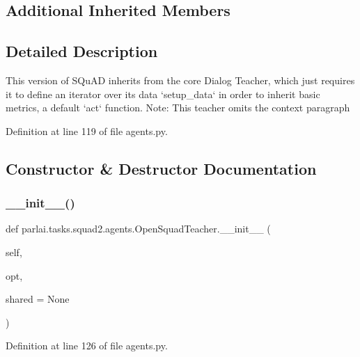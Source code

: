 \subsection*{Additional Inherited Members}


\subsection{Detailed Description}
\begin{DoxyVerb}This version of SQuAD inherits from the core Dialog Teacher, which just
requires it to define an iterator over its data `setup_data` in order to
inherit basic metrics, a default `act` function.
Note: This teacher omits the context paragraph
\end{DoxyVerb}
 

Definition at line 119 of file agents.\+py.



\subsection{Constructor \& Destructor Documentation}
\mbox{\label{classparlai_1_1tasks_1_1squad2_1_1agents_1_1OpenSquadTeacher_a97032124add4cb349ff65ac04900da82}} 
\subsubsection{\texorpdfstring{\+\_\+\+\_\+init\+\_\+\+\_\+()}{\_\_init\_\_()}}
{\footnotesize\ttfamily def parlai.\+tasks.\+squad2.\+agents.\+Open\+Squad\+Teacher.\+\_\+\+\_\+init\+\_\+\+\_\+ (\begin{DoxyParamCaption}\item[{}]{self,  }\item[{}]{opt,  }\item[{}]{shared = {\ttfamily None} }\end{DoxyParamCaption})}



Definition at line 126 of file agents.\+py.




